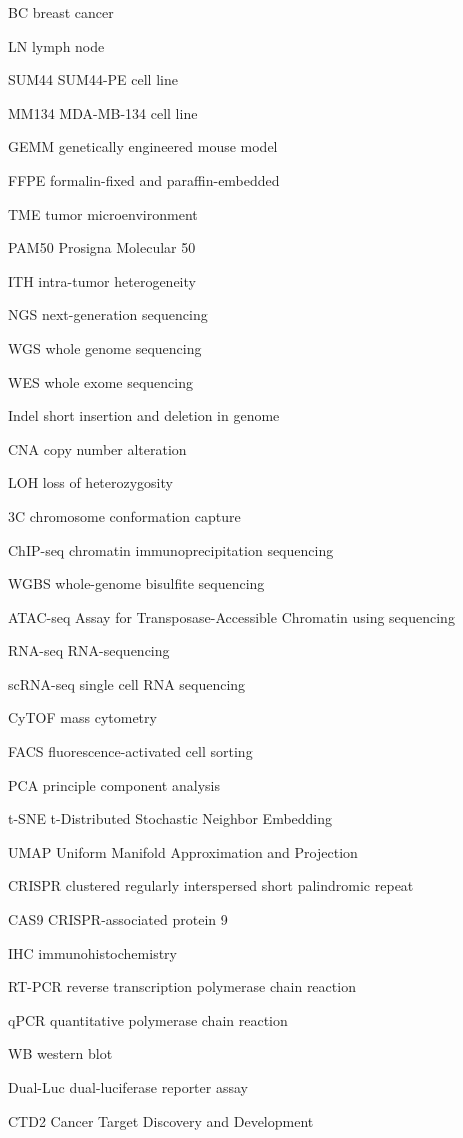 
\begin{denotation}[3cm]
  \item[BC]	breast cancer 
  \item[LN]	lymph node
  \item[SUM44]	SUM44-PE cell line
  \item[MM134]	MDA-MB-134 cell line
  \item[GEMM]	genetically engineered mouse model
  \item[FFPE]	formalin-fixed and paraffin-embedded
  \item[TME]	tumor microenvironment
  \item[PAM50]	Prosigna Molecular 50
  \item[ITH]	intra-tumor heterogeneity
  \item[NGS]	next-generation sequencing
  \item[WGS]	whole genome sequencing
  \item[WES]	whole exome sequencing
  \item[Indel]	short insertion and deletion in genome
  \item[CNA]	copy number alteration
  \item[LOH]	loss of heterozygosity
  \item[3C]	chromosome conformation capture
  \item[ChIP-seq]	chromatin immunoprecipitation sequencing
  \item[WGBS]	whole-genome bisulfite sequencing
  \item[ATAC-seq]	Assay for Transposase-Accessible Chromatin using sequencing
  \item[RNA-seq]	RNA-sequencing
  \item[scRNA-seq]	single cell RNA sequencing
  \item[CyTOF]	mass cytometry
  \item[FACS]	fluorescence-activated cell sorting 
  \item[PCA]	principle component analysis
  \item[t-SNE]	t-Distributed Stochastic Neighbor Embedding
  \item[UMAP]	Uniform Manifold Approximation and Projection
  \item[CRISPR]	clustered regularly interspersed short palindromic repeat
  \item[CAS9]	CRISPR-associated protein 9
  \item[IHC]	immunohistochemistry
  \item[RT-PCR]	reverse transcription polymerase chain reaction
  \item[qPCR]	quantitative polymerase chain reaction
  \item[WB western blot]	
  \item[Dual-Luc]	dual-luciferase reporter assay
  \item[CTD2]	Cancer Target Discovery and Development
\end{denotation}



